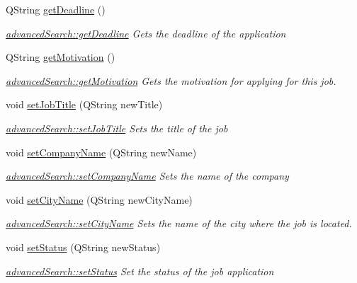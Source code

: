 \begin{DoxyCompactItemize}
Q\+String \mbox{\hyperlink{classadvanced_search_ae58a90dea341fa431df72e368b70267e}{get\+Deadline}} ()
\begin{DoxyCompactList}\small\item\em \mbox{\hyperlink{classadvanced_search_ae58a90dea341fa431df72e368b70267e}{advanced\+Search\+::get\+Deadline}} Gets the deadline of the application \end{DoxyCompactList}\item 
Q\+String \mbox{\hyperlink{classadvanced_search_a40af6df4af92bc7f4cff89729df2c6da}{get\+Motivation}} ()
\begin{DoxyCompactList}\small\item\em \mbox{\hyperlink{classadvanced_search_a40af6df4af92bc7f4cff89729df2c6da}{advanced\+Search\+::get\+Motivation}} Gets the motivation for applying for this job. \end{DoxyCompactList}\item 
void \mbox{\hyperlink{classadvanced_search_a698024f20a64fd27b1b352bce5c6f527}{set\+Job\+Title}} (Q\+String new\+Title)
\begin{DoxyCompactList}\small\item\em \mbox{\hyperlink{classadvanced_search_a698024f20a64fd27b1b352bce5c6f527}{advanced\+Search\+::set\+Job\+Title}} Sets the title of the job \end{DoxyCompactList}\item 
void \mbox{\hyperlink{classadvanced_search_a6d817d740d8e614bf93cec866735bd7f}{set\+Company\+Name}} (Q\+String new\+Name)
\begin{DoxyCompactList}\small\item\em \mbox{\hyperlink{classadvanced_search_a6d817d740d8e614bf93cec866735bd7f}{advanced\+Search\+::set\+Company\+Name}} Sets the name of the company \end{DoxyCompactList}\item 
void \mbox{\hyperlink{classadvanced_search_a285bcf54a61d42fa81a7d1a5a86c5779}{set\+City\+Name}} (Q\+String new\+City\+Name)
\begin{DoxyCompactList}\small\item\em \mbox{\hyperlink{classadvanced_search_a285bcf54a61d42fa81a7d1a5a86c5779}{advanced\+Search\+::set\+City\+Name}} Sets the name of the city where the job is located. \end{DoxyCompactList}\item 
void \mbox{\hyperlink{classadvanced_search_a1530d628ce32b4c867349a075b3828c3}{set\+Status}} (Q\+String new\+Status)
\begin{DoxyCompactList}\small\item\em \mbox{\hyperlink{classadvanced_search_a1530d628ce32b4c867349a075b3828c3}{advanced\+Search\+::set\+Status}} Set the status of the job application \end{DoxyCompactList}\item 

\end{DoxyCompactItemize}
